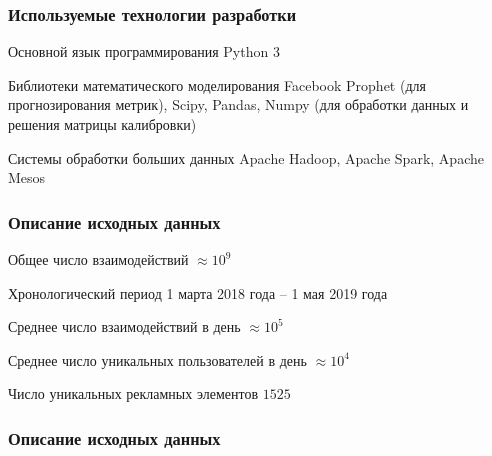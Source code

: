 \documentclass[handout]{beamer}
\begin{document}
\begin{frame}
    \frametitle{Используемые технологии разработки}
    \begin{block}{Основной язык программирования}
        Python 3
    \end{block}
    \begin{block}{Библиотеки математического моделирования}
        Facebook Prophet (для прогнозирования метрик), Scipy, Pandas, Numpy (для обработки данных и решения матрицы калибровки)
    \end{block}
    \begin{block}{Системы обработки больших данных}
        Apache Hadoop, Apache Spark, Apache Mesos
    \end{block} 
\end{frame}

\begin{frame}
    \frametitle{Описание исходных данных}
    \begin{block}{Общее число взаимодействий}
        $\approx 10^{9}$
    \end{block}
    \begin{block}{Хронологический период}
        1 марта 2018 года -- 1 мая 2019 года
    \end{block}
    \begin{block}{Среднее число взаимодействий в день}
        $\approx 10^{5}$
    \end{block}
    \begin{block}{Среднее число уникальных пользователей в день}
        $\approx 10^{4}$
    \end{block}
    \begin{block}{Число уникальных рекламных элементов}
        $1525$
    \end{block}
\end{frame}

\begin{frame}
    \frametitle{Описание исходных данных}
    \begin{figure}[ht]
        \centering
    \end{figure}
\end{frame}
\end{document}
